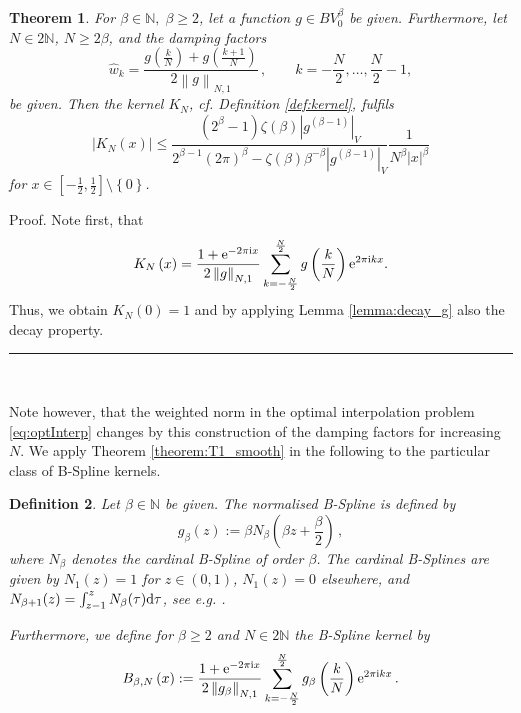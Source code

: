 \documentclass[11pt,a4paper,bibtotoc]{scrartcl}
\def\N{\mathbb{N}}
\def\ti{\mbox{\scriptsize{\rm i}}}
\newcommand{\eip}[1]{{\rm e}^{ 2\pi{\ti} #1}}
\newcommand{\eim}[1]{{\rm e}^{-2\pi{\ti} #1}}
\renewcommand{\d}{{\rm d}}
\renewcommand{\Box}{\hspace*{0ex} \hfill \rule{1.5ex}{1.5ex} \\ \goodbreak}
\newtheorem{theorem}{Theorem}[section]
\newtheorem{definition}[theorem]{Definition}
\newenvironment{Theorem}{\goodbreak \begin{theorem}\sl}{\end{theorem}}
\newenvironment{Definition}{\goodbreak \begin{definition}\rm}{\end{definition}}
\numberwithin{equation}{section}
\numberwithin{table}{section}
\numberwithin{figure}{section}
\begin{document}
\begin{Theorem}
 \label{theorem:T1_smooth}
 For $\beta \in \mathbb{N},\;\beta\ge 2$, let a function $g\in BV^{\beta}_0$
 be given.
 Furthermore, let $N\in2\mathbb{N}$, $N\ge 2\beta$, and the 
 damping factors
 \begin{equation*}
   \hat w_k=\frac{g\left(\frac{k}{N}\right)+g\left(\frac{k+1}{N}\right)}{
     2\left\|g\right\|_{N,1}}\,,\qquad k=-\frac{N}{2},\hdots,\frac{N}{2}-1,
 \end{equation*}
 be given.
 Then the kernel $K_N$, cf. Definition \ref{def:kernel},
 fulfils
 \begin{equation*}
   \left| K_N\left(x\right)\right| \le 
   \frac{\left(2^{\beta}-1\right)\zeta\left(\beta\right)
     \left|g^{\left(\beta-1\right)}\right|_V}
   {2^{\beta-1}\left(2\pi\right)^{\beta}- \zeta\left(\beta\right)
     \beta^{-\beta} \left|g^{\left(\beta-1\right)}\right|_V}
   \frac{1}{ N^{\beta}
     |x|^{\beta}}
 \end{equation*}
 for $x\in\left[-\frac{1}{2},\frac{1}{2}\right]\setminus
 \left\{0\right\}$.
\end{Theorem}
Proof. Note first, that
\begin{equation*}
K_N\left(x\right)
= \frac{1+\eim{x}}{2\left\|g\right\|_{N,1}}
\sum\limits_{k=-\frac{N}{2}}^{\frac{N}{2}} g\left(\frac{k}{N}\right) \eip{kx}.
\end{equation*}
Thus, we obtain $K_N(0)=1$ and by applying Lemma \ref{lemma:decay_g} also
the decay property.
\Box

Note however, that the weighted norm in the optimal interpolation problem
\eqref{eq:optInterp} changes by this construction of the damping factors for
increasing $N$.
We apply Theorem \ref{theorem:T1_smooth} in the following to the particular
class of B-Spline kernels.

\begin{Definition}\label{def:spline}
  Let $\beta \in \mathbb{N}$ be given.
  The {\em normalised B-Spline} is defined by
  \begin{equation*}
    g_{\beta}\left(z\right):=\beta N_{\beta}\left(\beta z+
        \frac{\beta}{2}\right)\,,
  \end{equation*}
  where $N_{\beta}$ denotes the cardinal B-Spline of order $\beta$.
  The cardinal B-Splines are given by $N_1(z)=1$ for $z\in(0,1)$,
  $N_1(z)=0$ elsewhere, and $N_{\beta+1}(z)=\int_{z-1}^{z}N_{\beta}(\tau)
  \d\tau$, see e.g. \cite{Chui88}.

  Furthermore, we define for $\beta \ge 2$ and $N\in 2\N$ the {\em B-Spline
  kernel} by
  \begin{equation*}
   B_{\beta,N}\left(x\right)
   :=\frac{1+\eim{x}}{2\left\|g_{\beta}\right\|_{N,1}}
   \sum_{k=-\frac{N}{2}}^{\frac{N}{2}} g_{\beta}\left(\frac{k}{N}\right)
   \eip{kx}\,.
  \end{equation*}
\end{Definition}
\end{document}
